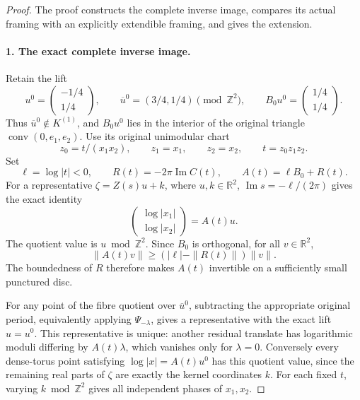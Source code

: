 \begin{proof}
The proof constructs the complete inverse image, compares its actual
framing with an explicitly extendible framing, and gives the extension.

\paragraph{1. The exact complete inverse image.}
Retain the lift
\[
 u^0=\begin{pmatrix}-1/4\\1/4\end{pmatrix},\qquad
 \overline u^0=(3/4,1/4)\pmod{\mathbb Z^2},\qquad
 B_0u^0=\begin{pmatrix}1/4\\1/4\end{pmatrix}.
\]
Thus \(\overline u^0\notin K^{(1)}\), and \(B_0u^0\) lies in the
interior of the original triangle \(\operatorname{conv}(0,e_1,e_2)\).
Use its original unimodular chart
\begin{equation}
 z_0=t/(x_1x_2),\qquad z_1=x_1,\qquad z_2=x_2,
 \qquad t=z_0z_1z_2.
 \label{cusp-null:eq:chart}
\end{equation}
Set
\[
 \ell=\log|t|<0,\qquad R(t)=-2\pi\operatorname{Im}C(t),\qquad
 A(t)=\ell B_0+R(t).
\]
For a representative \(\zeta=Z(s)u+k\), where \(u,k\in\mathbb R^2\),
\(\operatorname{Im}s=-\ell/(2\pi)\) gives the exact identity
\begin{equation}
 \begin{pmatrix}\log|x_1|\\\log|x_2|\end{pmatrix}
 =A(t)u.
 \label{cusp-null:eq:moduli}
\end{equation}
The quotient value is \(u\bmod\mathbb Z^2\).
Since \(B_0\) is orthogonal, for all \(v\in\mathbb R^2\),
\begin{equation}
 \|A(t)v\|\geq (|\ell|-\|R(t)\|)\|v\|.
 \label{cusp-null:eq:invertibility}
\end{equation}
The boundedness of \(R\) therefore makes \(A(t)\) invertible on a
sufficiently small punctured disc.

For any point of the fibre quotient over \(\overline u^0\), subtracting
the appropriate original period, equivalently applying
\(\Psi_{-\lambda}\), gives a representative with the exact lift
\(u=u^0\). This representative is unique: another residual translate
has logarithmic moduli differing by \(A(t)\lambda\), which vanishes
only for \(\lambda=0\). Conversely every dense-torus point satisfying
\(\log|x|=A(t)u^0\) has this quotient value, since the remaining real
parts of \(\zeta\) are exactly the kernel coordinates \(k\).
For each fixed \(t\), varying \(k\bmod\mathbb Z^2\) gives all independent
phases of \(x_1,x_2\).


\end{proof}
